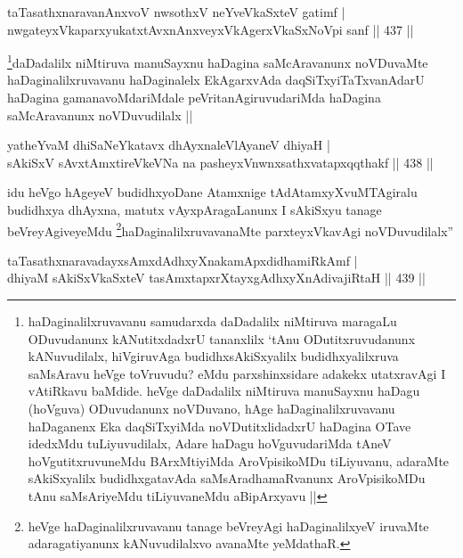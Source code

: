 \begin{shl}
taTasathxnaravanAnxvoV nwsothxV neYveVkaSxteV gatimf | \\
nwgateyxVkaparxyukatxtAvxnAnxveyxVkAgerxVkaSxNoV\s pi sanf \hfill||  437 ||  
\end{shl}

\begin{artha}
\footnote{haDaginalilxruvavanu samudarxda daDadalilx niMtiruva maragaLu ODuvudanunx kANutitxdadxrU tananxlilx `tAnu ODutitxruvudanunx kANuvudilalx, hiVgiruvAga budidhxsAkiSxyalilx budidhxyalilxruva saMsAravu heVge toVruvudu? eMdu parxshinxsidare adakekx utatxravAgi I vAtiRkavu baMdide. heVge daDadalilx niMtiruva manuSayxnu haDagu (hoVguva) ODuvudanunx noVDuvano, hAge haDaginalilxruvavanu haDaganenx Eka daqSiTxyiMda noVDutitxlidadxrU haDagina OTave idedxMdu tuLiyuvudilalx, Adare haDagu hoVguvudariMda tAneV hoVgutitxruvuneMdu BArxMtiyiMda AroVpisikoMDu tiLiyuvanu, adaraMte sAkiSxyalilx budidhxgatavAda saMsAradhamaRvanunx AroVpisikoMDu tAnu saMsAriyeMdu tiLiyuvaneMdu aBipArxyavu ||}daDadalilx niMtiruva manuSayxnu haDagina saMcAravanunx noVDuvaMte haDaginalilxruvavanu haDaginalelx EkAgarxvAda daqSiTxyiTaTxvanAdarU haDagina gamanavoMdariMdale peVritanAgiruvudariMda haDagina saMcAravanunx noVDuvudilalx ||
\end{artha}

\begin{shl}
yatheYvaM dhiSaNeYkatavx dhAyxnaleVlAyaneV dhiyaH | \\
sAkiSxV sAvxtAmxtireVkeVNa na pasheyxVnwnxsathxvatapxqqthakf \hfill||  438 ||  
\end{shl}

\begin{artha}
idu heVgo hAgeyeV budidhxyoDane Atamxnige tAdAtamxyXvuMTAgiralu budidhxya dhAyxna, matutx vAyxpAragaLanunx I sAkiSxyu tanage beVreyAgiveyeMdu \footnote{heVge haDaginalilxruvavanu tanage beVreyAgi haDaginalilxyeV iruvaMte adaragatiyanunx kANuvudilalxvo avanaMte yeMdathaR.}haDaginalilxruvavanaMte parxteyxVkavAgi noVDuvudilalx''
\end{artha}


\begin{shl}
taTasathxnaravadayxsAmxdAdhxyXnakamApxdidhamiRkAmf | \\
dhiyaM sAkiSxVkaSxteV tasAmxtapxrXtayxgAdhxyXnAdivajiRtaH \hfill||  439 ||  
\end{shl}

